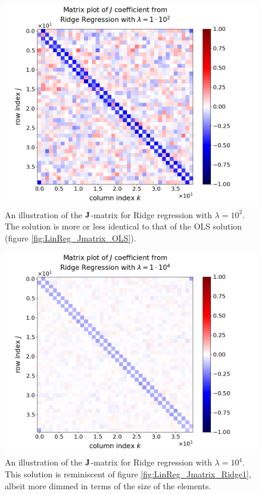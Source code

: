 \documentclass[nofootinbib,reprint,english]{revtex4-1}
\begin{document}
\newpage

\begin{figure}[h!]
\centering
\includegraphics[scale=0.3]{../output/LinReg/Jmatrix_Ridge1.png}
\caption{An illustration of the \(\vb{J}\)-matrix for Ridge regression with \(\lambda=10^2\). The solution is more or less identical to that of the OLS solution (figure \ref{fig:LinReg_Jmatrix_OLS}).}\label{fig:LinReg_Jmatrix_Ridge2}
\end{figure}

\begin{figure}[h!]
\centering
\includegraphics[scale=0.3]{../output/LinReg/Jmatrix_Ridge3.png}
\caption{An illustration of the \(\vb{J}\)-matrix for Ridge regression with \(\lambda=10^4\). This solution is reminiscent of figure \ref{fig:LinReg_Jmatrix_Ridge1}, albeit more dimmed in terms of the size of the elements.}\label{fig:LinReg_Jmatrix_Ridge3}
\end{figure}
\end{document}
